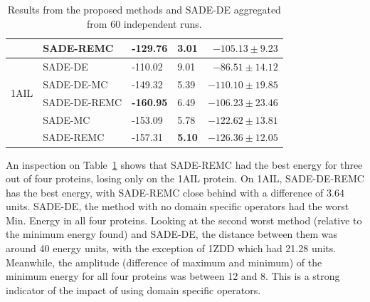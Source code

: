 \begin{table}[ht!]
\begin{tabular}{ l | l | l | l | r }
                      & SADE-REMC    & \textbf{-129.76} & 3.01                 & $ -105.13 \pm 9.23       $ \\ \hline \hline
\multirow{4}{*}{1AIL} & SADE-DE      & -110.02          & 9.01                 & $ -86.51 \pm 14.12       $ \\ \cline{2-5}
                      & SADE-DE-MC   & -149.32          & 5.39                 & $ -110.10 \pm 19.85      $ \\ \cline{2-5}
                      & SADE-DE-REMC & \textbf{-160.95} & 6.49                 & $ -106.23 \pm 23.46      $ \\ \cline{2-5}
                      & SADE-MC      & -153.09          & 5.78                 & $ -122.62 \pm 13.81      $ \\ \cline{2-5}
                      & SADE-REMC    & -157.31          & \textbf{5.10}        & $ \bm{-126.36 \pm 12.05} $ \\ \hline \hline
  \end{tabular}
  \caption{Results from the proposed methods and SADE-DE aggregated from 60 independent runs.}
  \label{tab:proposed-methods-results}
\end{table}

An inspection on Table~\ref{tab:proposed-methods-results}
shows that SADE-REMC had the best energy for three out of
four proteins, losing only on the 1AIL protein.
On 1AIL, SADE-DE-REMC has the best energy, with SADE-REMC close behind with a difference of
$3.64$ units. SADE-DE, the method with no domain specific operators had the worst
Min. Energy in all four proteins. Looking at the second worst method (relative to the minimum
energy found) and SADE-DE, the distance between them was around 40 energy units, with the
exception of 1ZDD which had 21.28 units. Meanwhile, the amplitude (difference of maximum
and minimum) of the minimum energy for all four proteins was between 12 and 8. This
is a strong indicator of the impact of using domain specific operators.



